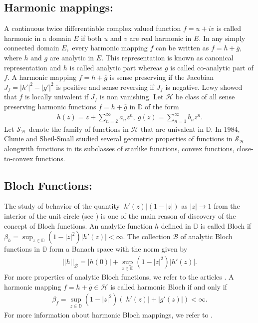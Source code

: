 \documentclass[a4paper,12pt]{amsart}
\theoremstyle{definition}
\newcounter {own}
\begin{document}
	\subsection{Harmonic mappings:}	
 A continuous twice differentiable complex valued function $f=u+iv$ is called harmonic in a domain $E$ if both $u$ and $v$ are real harmonic in $E.$ In any simply connected domain $E,$ every harmonic mapping $f$ can be written as $f=h+\overline{g},$ where $h$ and $g$ are analytic in $E.$ This representation is known as canonical representation and $h$ is called analytic part whereas $g$ is called co-analytic part of $f.$ A harmonic mapping $f=h+\overline{g}$ is sense preserving if the Jacobian $J_f=|h'|^2-|g'|^2$ is positive and sense reversing if $J_f$ is negative. Lewy \cite{Lewy-1936} showed that $f$ is locally univalent if $J_f$ is non vanishing. Let $\mathcal{H}$ be class of all sense preserving harmonic functions $f=h+\overline{g}$ in $\mathbb{D}$ of the form
    \begin{align}\label{P-151}
		h(z)=z+\sum\limits_{n=2}^\infty a_nz^n,~g(z)=\sum\limits_{n=1}^\infty b_nz^n.
	\end{align}
	Let $\mathcal{S_H}$ denote the family of functions in $\mathcal{H}$ that are univalent in $\mathbb{D}$. In 1984, Clunie and Sheil-Small \cite{Clunie-Small-1984} studied several geometric properties of functions in $\mathcal{S_H}$ alongwith functions in its  subclasses of starlike functions, convex functions, close-to-convex functions.
	
	\subsection{Bloch Functions:}
	 
	The study of behavior of the quantity $|h'(z)|(1-|z|)$ as $|z|\rightarrow 1$ from the interior of the unit circle (see \cite{Seidel-Walsh-1942}) is one of the main reason of discovery of the concept of Bloch functions. An analytic function $h$  defined in $\mathbb{D}$ is called Bloch if $\beta_h=\sup_{z\in\mathbb{D}}(1-|z|^2)|h'(z)|<\infty.$	The collection $\mathcal{B}$ of analytic Bloch functions in $\mathbb{D}$ form a Banach space with the norm given by
	\begin{align*}
		||h||_{\mathcal{B}}=|h(0)|+\sup_{z\in\mathbb{D}}(1-|z|^2)|h'(z)|.
	\end{align*} 
	For more properties of analytic Bloch functions, we refer to the articles \cite{Pommerenke-1970, Anderson-Clunie-Pommerenke-1974,  Anderson-Shields-1976, Bonk-1991, Bonk-Minda-Yanagihara-1996}. A harmonic mapping $f=h+\overline{g}\in\mathcal{H}$ is called harmonic Bloch if and only if
	\begin{align*}
		\beta_f=\sup_{z\in\mathbb{D}}(1-|z|^2)(|h'(z)|+|g'(z)|)<\infty.
	\end{align*}
	For more information about harmonic Bloch mappings, we refer to \cite{Ali-Pandit-2023, Chen-Gauthier-Hengartner-2000, Colonna-1989}.
	
\end{document}
